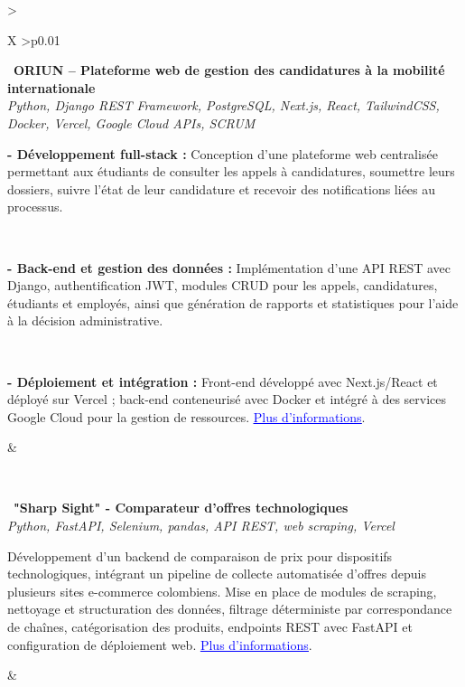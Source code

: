 \documentclass[letterpaper,8pt]{extarticle}
\newcommand{\indentbox}[2][1em]{\hspace*{#1}\parbox{\dimexpr\linewidth-#1\relax}{#2}}
\begin{document}
\begin{tabularx}{\textwidth}{>{\raggedright\arraybackslash}X >{\raggedleft\arraybackslash}p{0.01\textwidth}}
    \begin{minipage}[t]{\linewidth}\raggedright
      \textbullet\ \textbf{ORIUN -- Plateforme web de gestion des candidatures à la mobilité internationale}\\
      \textit{\footnotesize Python, Django REST Framework, PostgreSQL, Next.js, React, TailwindCSS, Docker, Vercel, Google Cloud APIs, SCRUM}\\
      \indentbox{\footnotesize \textbf{- Développement full-stack : } Conception d'une plateforme web centralisée permettant aux étudiants de consulter les appels à candidatures, soumettre leurs dossiers, suivre l'état de leur candidature et recevoir des notifications liées au processus.}\\
      \indentbox{\footnotesize \textbf{- Back-end et gestion des données : } Implémentation d'une API REST avec Django, authentification JWT, modules CRUD pour les appels, candidatures, étudiants et employés, ainsi que génération de rapports et statistiques pour l'aide à la décision administrative.}\\
      \indentbox{\footnotesize \textbf{- Déploiement et intégration : } Front-end développé avec Next.js/React et déployé sur Vercel ; back-end conteneurisé avec Docker et intégré à des services Google Cloud pour la gestion de ressources. 
      \href{https://github.com/JavierTarazona06/ORIUN_back}{\textcolor{blue}{\underline{Plus d'informations}}}.}
    \end{minipage}
    &
    \begin{minipage}[t]{\linewidth}\raggedleft %
    \end{minipage}\\

    \begin{minipage}[t]{\linewidth}\raggedright
      \textbullet\ \textbf{"Sharp Sight" - Comparateur d'offres technologiques}\\
      \textit{\footnotesize Python, FastAPI, Selenium, pandas, API REST, web scraping, Vercel}\\
      \indentbox{\footnotesize Développement d'un backend de comparaison de prix pour dispositifs technologiques, intégrant un pipeline de collecte automatisée d'offres depuis plusieurs sites e-commerce colombiens. Mise en place de modules de scraping, nettoyage et structuration des données, filtrage déterministe par correspondance de chaînes, catégorisation des produits, endpoints REST avec FastAPI et configuration de déploiement web. \href{https://github.com/JavierTarazona06/SharpSight}{\textcolor{blue}{\underline{Plus d'informations}}}.}
    \end{minipage}
    &
    \begin{minipage}[t]{\linewidth}\raggedleft %
    \end{minipage}\\

  \end{tabularx}
\end{document}
